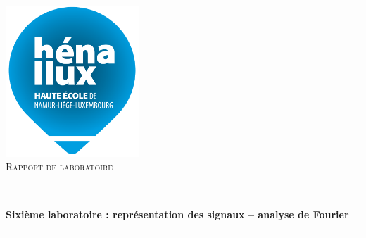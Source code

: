 \documentclass[a4paper]{article}
\newcommand{\HRule}{\rule{\linewidth}{0.5mm}}
\newcommand{\bgimg}[1]{
\AddToShipoutPicture
   {
      \put(\LenToUnit{0 cm},\LenToUnit{0 cm})
      {
            \texttt{[image: \#1]} 
      }
   }
}
\begin{document}

















\begin{titlepage}
    \begin{sffamily}
        \begin{center}
            \includegraphics[width=5cm]{images/LogoHenallux.PNG}~\\[1.5cm]
            \textsc{\Large Rapport de laboratoire}\\[1.5cm]

            \HRule \\[0.4cm]
            { \huge \bfseries Sixième laboratoire : représentation des signaux – analyse de Fourier \\[0.4cm] }
            \HRule \\[2cm]


\end{center}
\end{sffamily}
\end{titlepage}
\end{document}
